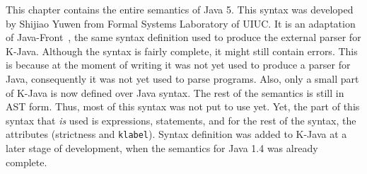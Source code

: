 This chapter contains the entire semantics of Java 5.
This syntax was developed by Shijiao Yuwen from Formal Systems Laboratory of UIUC.
It is an adaptation of Java-Front~\cite{java-front}, the same syntax definition used to produce the external parser for K-Java.
Although the syntax is fairly complete, it might still contain errors.
This is because at the moment of writing it was not yet used to produce a parser for Java, consequently it was not yet used to parse programs.
Also, only a small part of K-Java is now defined over Java syntax.
The rest of the semantics is still in AST form.
Thus, most of this syntax was not put to use yet.
Yet, the part of this syntax that \textit{is} used is expressions, statements, and for the rest of the syntax, the attributes (strictness and \texttt{klabel}).
Syntax definition was added to K-Java at a later stage of development, when the semantics for Java 1.4 was already complete.
